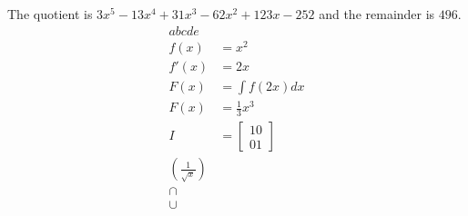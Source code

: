 \documentclass{article}
\begin{document}
        The quotient is $3x^5 - 13x^4 + 31x^3 - 62x^2 + 123x - 252$ and the remainder is $496$.
        \begin{align}
                abcde\\
                f(x) &= x^2\\
                f'(x) &= 2x\\
                F(x) &= \int f(2x)dx\\
                F(x) &= \frac{1}{3}x^3\\
                I &=    \begin{bmatrix}
                                1 0\\
                                0 1
                        \end{bmatrix}\\
                \left(\frac{1}{\sqrt{x}}\right)\\
                \cap\\
                \cup
        \end{align}
\end{document}
